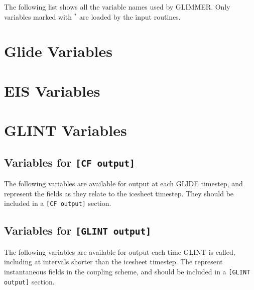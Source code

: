 \label{ug.sec.varlist}
The following list shows all the variable names used by GLIMMER. Only variables marked with $^\ast$ are loaded by the input routines.
\section{Glide Variables}

\section{EIS Variables}

\section{GLINT Variables}
\subsection{Variables for \texttt{[CF output]}}
The following variables are available for output at each GLIDE
timestep, and represent the fields as they relate to the icesheet
timestep. They should be included in a \texttt{[CF output]} section.

\subsection{Variables for \texttt{[GLINT output]}}
The following variables are available for output each time GLINT is
called, including at intervals shorter than the icesheet timestep. The
represent instantaneous fields in the coupling scheme, and should be
included in a \texttt{[GLINT output]} section.

